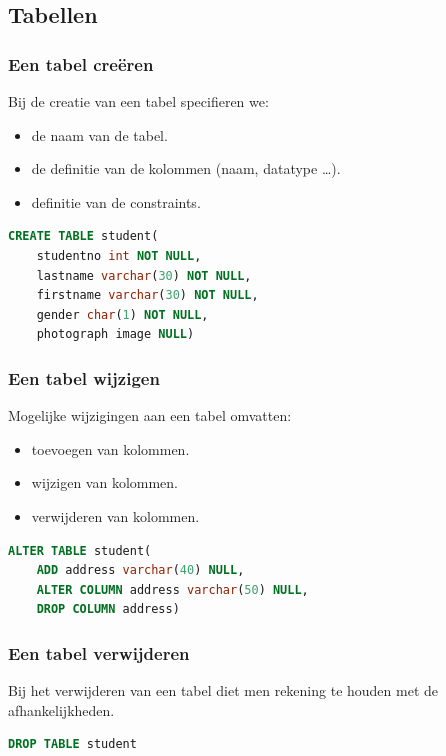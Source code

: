 \documentclass[a4paper,12pt]{article}
\begin{document}
\subsection{Tabellen}
\subsubsection{Een tabel creëren}
Bij de creatie van een tabel specifieren we:
\begin{itemize}
\item de naam van de tabel.
\item de definitie van de kolommen (naam, datatype \dots).
\item definitie van de constraints.
\end{itemize}

\begin{lstlisting}[language=sql, breaklines=true]
CREATE TABLE student(
	studentno int NOT NULL,
	lastname varchar(30) NOT NULL,
	firstname varchar(30) NOT NULL,
	gender char(1) NOT NULL,
	photograph image NULL)
\end{lstlisting}

\subsubsection{Een tabel wijzigen}
Mogelijke wijzigingen aan een tabel omvatten:
\begin{itemize}
\item toevoegen van kolommen.
\item wijzigen van kolommen.
\item verwijderen van kolommen.
\end{itemize}

\begin{lstlisting}[language=sql, breaklines=true]
ALTER TABLE student(
	ADD address varchar(40) NULL,
	ALTER COLUMN address varchar(50) NULL,
	DROP COLUMN address)
\end{lstlisting}

\subsubsection{Een tabel verwijderen}
Bij het verwijderen van een tabel diet men rekening te houden met de afhankelijkheden.

\begin{lstlisting}[language=sql, breaklines=true]
DROP TABLE student
\end{lstlisting}
\end{document}
